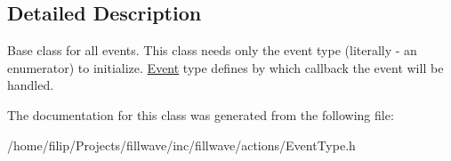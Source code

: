 \subsection{Detailed Description}
Base class for all events. This class needs only the event type (literally -\/ an enumerator) to initialize. \hyperlink{classfillwave_1_1actions_1_1Event}{Event} type defines by which callback the event will be handled. 

The documentation for this class was generated from the following file\+:\begin{DoxyCompactItemize}
\item 
/home/filip/\+Projects/fillwave/inc/fillwave/actions/Event\+Type.\+h\end{DoxyCompactItemize}
